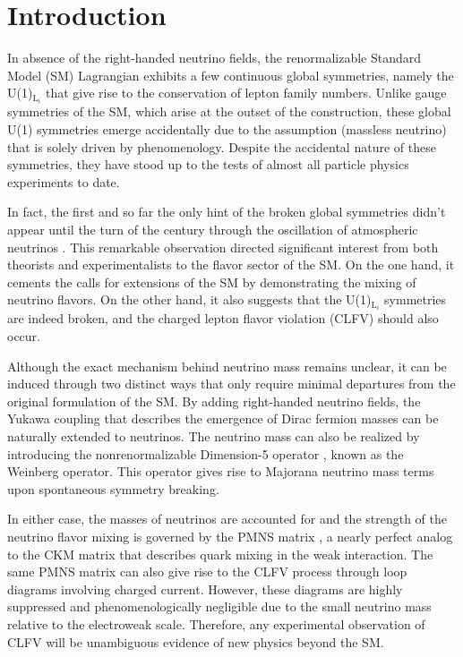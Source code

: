 \chapter{Introduction}
\label{chap:Introduction}

In absence of the right-handed neutrino fields, the renormalizable Standard Model (SM) Lagrangian exhibits a few continuous global symmetries, namely the U(1)$_{\text{L}_{i}}$ that give rise to the conservation of lepton family numbers. Unlike gauge symmetries of the SM, which arise at the outset of the construction, these global U(1) symmetries emerge accidentally due to the assumption (massless neutrino) that is solely driven by phenomenology. Despite the accidental nature of these symmetries, they have stood up to the tests of almost all particle physics experiments to date.  

In fact, the first and so far the only hint of the broken global symmetries didn't appear until the turn of the century through the oscillation of atmospheric neutrinos \cite{Super-Kamiokande:1998kpq,SNO:2002tuh}. This remarkable observation directed significant interest from both theorists and experimentalists to the flavor sector of the SM. On the one hand, it cements the calls for extensions of the SM by demonstrating the mixing of neutrino flavors. On the other hand, it also suggests that the U(1)$_{\text{L}_{i}}$ symmetries are indeed broken, and the charged lepton flavor violation (CLFV) should also occur. 

Although the exact mechanism behind neutrino mass remains unclear, it can be induced through two distinct ways that only require minimal departures from the original formulation of the SM. By adding right-handed neutrino fields, the Yukawa coupling \cite{Weinberg:1967tq} that describes the emergence of Dirac fermion masses can be naturally extended to neutrinos. The neutrino mass can also be realized by introducing the nonrenormalizable Dimension-5 operator \cite{Weinberg:1979sa}, known as the Weinberg operator. This operator gives rise to Majorana neutrino mass terms upon spontaneous symmetry breaking. 

In either case, the masses of neutrinos are accounted for and the strength of the neutrino flavor mixing is governed by the PMNS matrix \cite{Pontecorvo:1957cp,Maki:1962mu}, a nearly perfect analog to the CKM matrix \cite{Cabibbo:1963yz,Kobayashi:1973fv} that describes quark mixing in the weak interaction. The same PMNS matrix can also give rise to the CLFV process through loop diagrams involving charged current. However, these diagrams are highly suppressed and phenomenologically negligible due to the small neutrino mass relative to the electroweak scale. Therefore, any experimental observation of CLFV will be unambiguous evidence of new physics beyond the SM.

